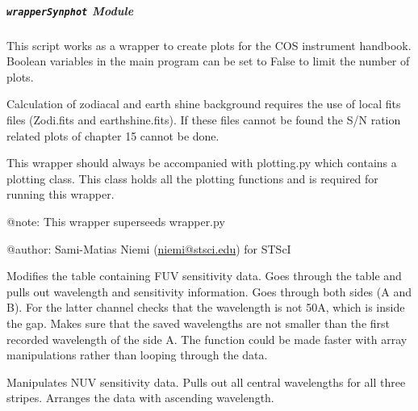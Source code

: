 \documentclass[letterpaper,10pt,english]{sphinxmanual}
\begin{document}
\begin{fulllineitems}
\label{SamPy.plot.COSIHB:SamPy.plot.COSIHB.synphotSensitivity.throughputs}
\end{fulllineitems}



\subparagraph{\texttt{wrapperSynphot} Module}
\label{SamPy.plot.COSIHB:wrappersynphot-module}\label{SamPy.plot.COSIHB:module-SamPy.plot.COSIHB.wrapperSynphot}
This script works as a wrapper to create plots for the COS instrument handbook.
Boolean variables in the main program can be set to False to limit the number
of plots.

Calculation of zodiacal and earth shine background requires the use of local
fits files (Zodi.fits and earthshine.fits). If these files cannot be found
the S/N ration related plots of chapter 15 cannot be done.

This wrapper should always be accompanied with plotting.py which contains
a plotting class. This class holds all the plotting functions and is required
for running this wrapper.

@note: This wrapper superseeds wrapper.py

@author: Sami-Matias Niemi (\href{mailto:niemi@stsci.edu}{niemi@stsci.edu}) for STScI


\begin{fulllineitems}
\label{SamPy.plot.COSIHB:SamPy.plot.COSIHB.wrapperSynphot.FUVSensitivityDataMod}
Modifies the table containing FUV sensitivity data. Goes through the table and
pulls out wavelength and sensitivity information. Goes through both sides (A and B).
For the latter channel checks that the wavelength is not 50A, which is inside the gap.
Makes sure that the saved wavelengths are not smaller than the first recorded  wavelength
of the side A.
The function could be made faster with array manipulations rather than looping
through the data.

\end{fulllineitems}



\begin{fulllineitems}
\label{SamPy.plot.COSIHB:SamPy.plot.COSIHB.wrapperSynphot.NUVSensitivityDataMod}
Manipulates NUV sensitivity data. Pulls out all central wavelengths for all three
stripes. Arranges the data with ascending wavelength.

\end{fulllineitems}
\end{document}
